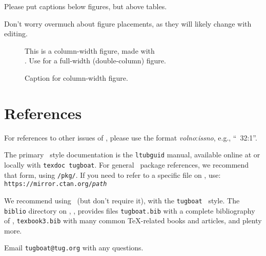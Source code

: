 \documentclass{ltugboat}
\begin{document}
Please put captions below figures, but above tables.

Don't worry overmuch about figure placements, as they will likely change
with editing.

\begin{figure}
This is a column-width figure, made with \\
. Use  for a full-width
(double-column) figure.
%
\caption{Caption for column-width figure.}
\label{fig.example}
\end{figure}


\section{References}

For references to other issues of \TUB, please use the format
\textsl{volno}:\textsl{issno}, e.g., ``\TUB\ 32:1''.

The primary \TUB\ style documentation is the \texttt{ltubguid} manual,
available online at  or locally with
\texttt{texdoc tugboat}. For general \CTAN\ package references, we
recommend that form, using \texttt{/pkg/}. If you need to refer to a
specific file on \CTAN, use:\\
\texttt{https://mirror.ctan.org/\textsl{path}}

We recommend using \BibTeX\ (but don't require it), with the
\texttt{tugboat} \BibTeX\ style. The \texttt{biblio} directory on \CTAN,
, provides files \texttt{tugboat.bib} with a
complete bibliography of \TUB, \texttt{texbook3.bib} with many common
\TeX-related books and articles, and plenty more.

Email \verb|tugboat@tug.org| with any questions.

\nocite{book-minimal}       %

\makesignature
\end{document}
